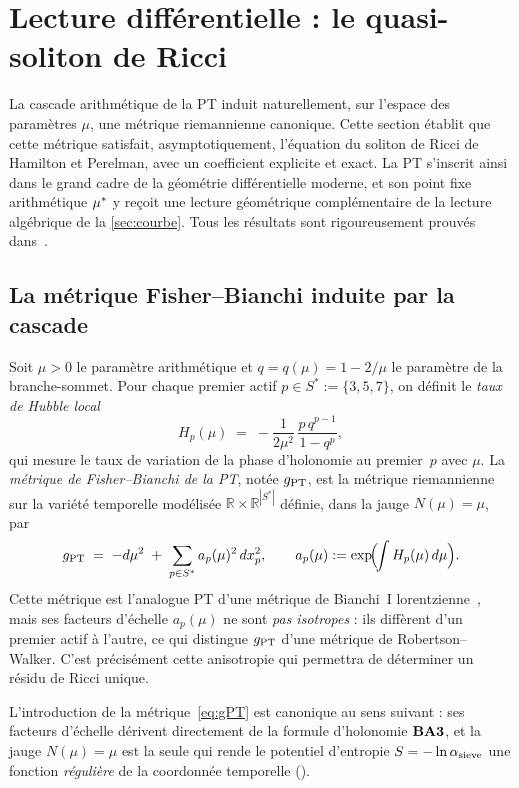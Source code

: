 \section{Lecture différentielle : le quasi-soliton de Ricci}
\label{sec:soliton}

La cascade arithmétique de la PT induit naturellement, sur l'espace des paramètres $\mu$, une métrique riemannienne canonique. Cette section établit que cette métrique satisfait, asymptotiquement, l'équation du soliton de Ricci de Hamilton et Perelman, avec un coefficient explicite et exact. La PT s'inscrit ainsi dans le grand cadre de la géométrie différentielle moderne, et son point fixe arithmétique $\mu^{*}$ y reçoit une lecture géométrique complémentaire de la lecture algébrique de la \ref{sec:courbe}. Tous les résultats sont rigoureusement prouvés dans~\cite{PT_GeoFlow_RicciSoliton}.

\subsection{La métrique Fisher--Bianchi induite par la cascade}
\label{sec:soliton:metric}

Soit $\mu > 0$ le paramètre arithmétique et $q = q(\mu) = 1 - 2/\mu$ le paramètre de la branche-sommet. Pour chaque premier actif $p \in S^{*} := \{3, 5, 7\}$, on définit le \emph{taux de Hubble local}
\begin{equation}
H_p(\mu) \;=\; -\dfrac{1}{2\mu^{2}}\,\dfrac{p\,q^{p-1}}{1 - q^{p}},
\label{eq:Hubble_local}
\end{equation}
qui mesure le taux de variation de la phase d'holonomie au premier~$p$ avec $\mu$. La \emph{métrique de Fisher--Bianchi de la PT}, notée $g_{\rm PT}$, est la métrique riemannienne sur la variété temporelle modélisée $\mathbb R \times \mathbb R^{|S^{*}|}$ définie, dans la jauge $N(\mu) = \mu$, par
\begin{equation}
g_{\rm PT} \;=\; -d\mu^{2} \;+\; \sum_{p \in S^{*}} a_p(\mu)^{2}\, dx_p^{2},
\qquad
a_p(\mu) := \exp\!\Bigl(\!\int H_p(\mu)\, d\mu\Bigr).
\label{eq:gPT}
\end{equation}
Cette métrique est l'analogue PT d'une métrique de Bianchi~I lorentzienne~\cite{ChowKnopf2004}, mais ses facteurs d'échelle $a_p(\mu)$ ne sont \emph{pas isotropes} : ils diffèrent d'un premier actif à l'autre, ce qui distingue $g_{\rm PT}$ d'une métrique de Robertson--Walker. C'est précisément cette anisotropie qui permettra de déterminer un résidu de Ricci unique.

L'introduction de la métrique~\eqref{eq:gPT} est canonique au sens suivant : ses facteurs d'échelle dérivent directement de la formule d'holonomie $\textbf{BA3}$, et la jauge $N(\mu) = \mu$ est la seule qui rende le potentiel d'entropie $S = -\ln \alpha_{\rm sieve}$ une fonction \emph{régulière} de la coordonnée temporelle (\cite[\S 2]{PT_GeoFlow_RicciSoliton}).

